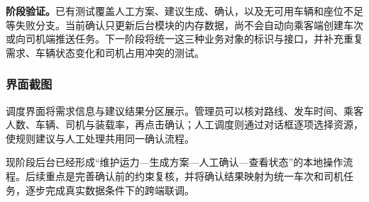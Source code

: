 \noindent\textbf{阶段验证。}已有测试覆盖人工方案、建议生成、确认，以及无可用车辆和座位不足等失败分支。当前确认只更新后台模块的内存数据，尚不会自动向乘客端创建车次或向司机端推送任务。下一阶段将统一这三种业务对象的标识与接口，并补充重复需求、车辆状态变化和司机占用冲突的测试。

\clearpage
\subsubsection{界面截图}

调度界面将需求信息与建议结果分区展示。管理员可以核对路线、发车时间、乘客人数、车辆、司机与装载率，再点击确认；人工调度则通过对话框逐项选择资源，使规则建议与人工处理共用同一确认流程。

现阶段后台已经形成“维护运力—生成方案—人工确认—查看状态”的本地操作流程。后续重点是完善确认前的约束复核，并将确认结果映射为统一车次和司机任务，逐步完成真实数据条件下的跨端联调。
